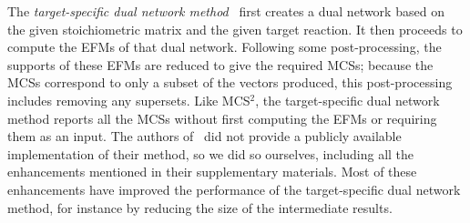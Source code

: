 \documentclass{bioinfo}
\theoremstyle{plain}
\theoremstyle{definition}
\begin{document}
The \emph{target-specific dual network method}~\cite{Duality} first creates a dual network based on the given stoichiometric matrix and the given target reaction. %
It then proceeds to compute the EFMs of that dual network. Following some post-processing, the supports of these EFMs are reduced to give the required MCSs; because the MCSs correspond to only a subset of the vectors produced, this post-processing includes removing any supersets. %
Like MCS$^2$, the target-specific dual network method reports all the MCSs without first computing the EFMs or requiring them as an input. The authors of~\cite{Duality} did not provide a publicly available implementation of their method, so we did so ourselves, including all the enhancements mentioned in their supplementary materials. Most of these enhancements have improved the performance of the target-specific dual network method, %
for instance by reducing the size of the intermediate results. %


\end{document}
